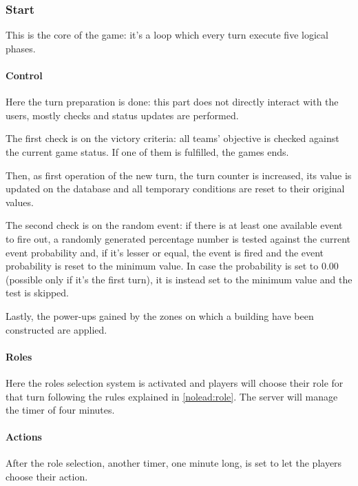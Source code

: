 		\subsubsection{Start}
		\label{workflow:start}
			
			This is the core of the game: it's a loop which every turn execute five logical phases.
				
			\paragraph{Control}
			
				Here the turn preparation is done: this part does not directly interact with the users, mostly checks and status updates are performed.
			
				The first check is on the victory criteria: all teams' objective is checked against the current game status. If one of them is fulfilled, the games ends.
				
				Then, as first operation of the new turn, the turn counter is increased, its value is updated on the database and all temporary conditions are reset to their original values.
				
				The second check is on the random event: if there is at least one available event to fire out, a randomly generated percentage number is tested against the current event probability and, if it's lesser or equal, the event is fired and the event probability is reset to the minimum value.
				In case the probability is set to 0.00 (possible only if it's the first turn), it is instead set to the minimum value and the test is skipped.
				
				Lastly, the power-ups gained by the zones on which a building have been constructed are applied.
				
			\paragraph{Roles}
			
				Here the roles selection system is activated and players will choose their role for that turn following the rules explained in \autoref{nolead:role}.
				The server will manage the timer of four minutes.
				
			\paragraph{Actions}
				
				After the role selection, another timer, one minute long, is set to let the players choose their action.
				

